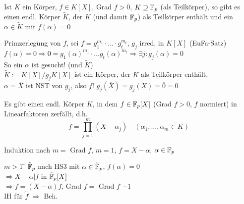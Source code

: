 \documentclass[a4paper,twoside,DIV15,BCOR12mm]{scrbook}
\begin{document}
\begin{hilfssatz}[3]
Ist $K$ ein Körper, $f \in K[X]$, Grad $f > 0$, $K \supseteq \mathbb{F}_p$ (als Teilkörper), so gibt es einen endl. Körper $\tilde K$, der $K$ (und damit $\mathbb{F}_p$) als Teilkörper enthält und ein $\alpha \in \tilde K$ mit $f(\alpha)=0$
\end{hilfssatz}
\begin{beweis}
Primzerlegung von $f$, sei $f=g_1^{m_1} \cdot \dotsc \cdot g_t^{m_t}$, $g_j$ irred. in $K[X]$ (EuFa-Satz) \\
$f(\alpha) = 0 \Rightarrow 0 = g_1(\alpha)^{m_1} \cdot \dotsc g_t(\alpha)^{m_t} \Rightarrow \exists j: g_j(\alpha) = 0$ \\
So ein $\alpha$ ist gesucht! (und $\tilde K$)\\
$\tilde K := K[X]/g_jK[X]$ ist ein Körper, der $K$ als Teilkörper enthält. \\
$\alpha = \overline X$ ist NST von $g_j$, also $f$! $g_j(\overline X) = \overline{g_j(X)}=\overline 0 = 0$
\end{beweis}
\begin{hilfssatz}[4]
Es gibt einen endl. Körper $K$, in dem $f \in \mathbb{F}_p[X]$ (Grad $f > 0$, $f$ normiert) in Linearfaktoren zerfällt, d.h.
$$f=\prod_{j=1}^m(X-\alpha_j)\quad(\alpha_1,\dotsc,\alpha_m \in K)$$
\end{hilfssatz}
\begin{beweis}
Induktion nach $m =$ Grad $f$, $m=1$, $f=X-\alpha$, $\alpha \in \mathbb{F}_p$ 
\begin{tabbing}
$m>1$ \= $\tilde {\mathbb{F}}_p$ nach HS3 mit $\alpha \in \tilde {\mathbb{F}}_p$, $f(\alpha)=0$ \\
\> $\Rightarrow X-\alpha | f$ in $\tilde {\mathbb{F}}_p[X]$ \\
\> $\Rightarrow f = (X-\alpha)\tilde f$, Grad $\tilde f=$ Grad $f$ $-1$ \\
\> IH für $\tilde f$ $\Rightarrow$ Beh.
\end{tabbing}
\end{beweis}
\end{document}
